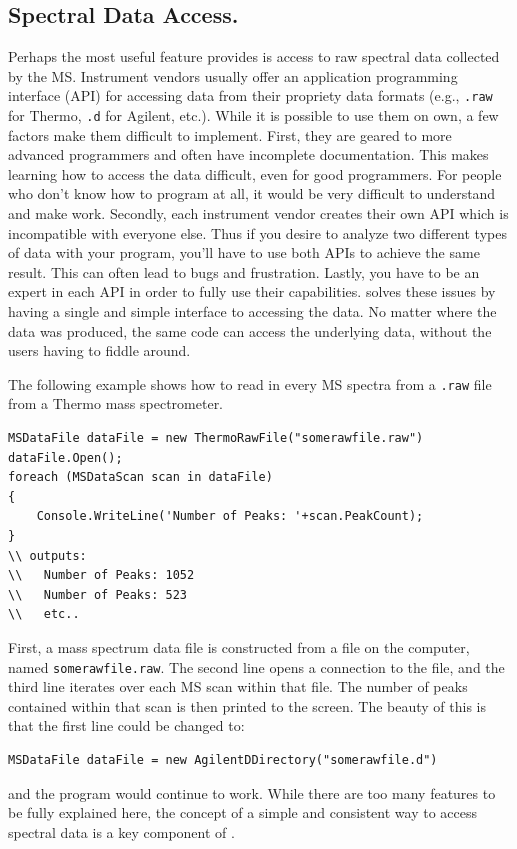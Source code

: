 \subsection*{Spectral Data Access.}
Perhaps the most useful feature \csmsl{} provides is access to raw spectral data collected by the MS. Instrument vendors usually offer an application programming interface (API) for accessing data from their propriety data formats (e.g., \texttt{.raw} for Thermo, \texttt{.d} for Agilent, etc.). While it is possible to use them on own, a few factors make them difficult to implement. First, they are geared to more advanced programmers and often have incomplete documentation. This makes learning how to access the data difficult, even for good programmers. For people who don't know how to program at all, it would be very difficult to understand and make work. Secondly, each instrument vendor creates their own API which is incompatible with everyone else. Thus if you desire to analyze two different types of data with your program, you'll have to use both APIs to achieve the same result. This can often lead to bugs and frustration. Lastly, you have to be an expert in each API in order to fully use their capabilities. \csmsl{} solves these issues by having a single and simple interface to accessing the data. No matter where the data was produced, the same code can access the underlying data, without the users having to fiddle around. 

The following example shows how to read in every MS spectra from a \texttt{.raw} file from a Thermo mass spectrometer.
\begin{lstlisting}
MSDataFile dataFile = new ThermoRawFile("somerawfile.raw")
dataFile.Open();                   
foreach (MSDataScan scan in dataFile)
{             
    Console.WriteLine('Number of Peaks: '+scan.PeakCount);
}
\\ outputs:
\\   Number of Peaks: 1052
\\   Number of Peaks: 523
\\   etc..
\end{lstlisting}
First, a mass spectrum data file is constructed from a file on the computer, named \texttt{somerawfile.raw}. The second line opens a connection to the file, and the third line iterates over each MS scan within that file. The number of peaks contained within that scan is then printed to the screen. The beauty of this is that the first line could be changed to:
\begin{lstlisting}
MSDataFile dataFile = new AgilentDDirectory("somerawfile.d")
\end{lstlisting}
and the program would continue to work. While there are too many features to be fully explained here, the concept of a simple and consistent way to access spectral data is a key component of \csmsl{}. 


